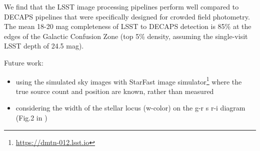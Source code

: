 \documentclass[DM,lsstdraft,toc,usenatbib]{lsstdoc}
\begin{document}
We find that the LSST image processing pipelines perform well compared to DECAPS pipelines that were specifically designed for crowded field photometry.  The mean 18-20 mag completeness of LSST to DECAPS detection is 85\%  at the edges of the Galactic Confusion Zone (top 5\% density, assuming the single-visit LSST depth of 24.5 mag).

Future work:

\begin{itemize}
\item using the simulated sky images with StarFast image simulator\footnote{\url{https://dmtn-012.lsst.io}} where the true source count and position are known, rather than measured
\item considering the width of the stellar locus (w-color) on the g-r s r-i diagram (Fig.2 in \cite{ivezic2004})
\end{itemize}






\end{document}
